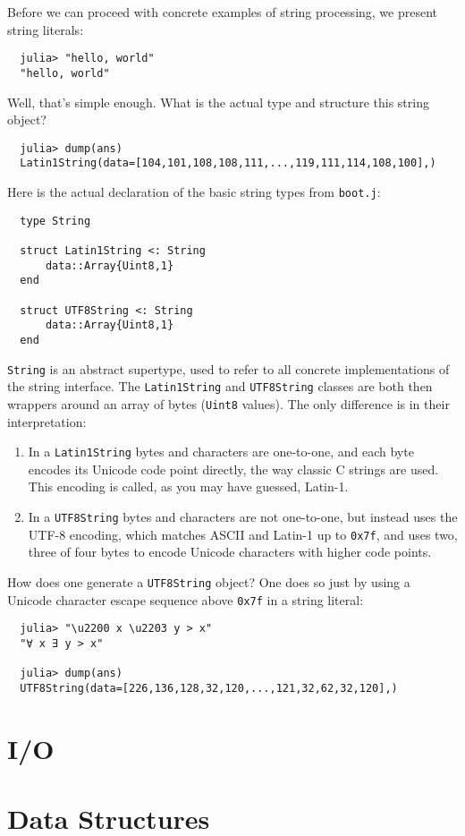 \documentclass{article}
\begin{document}
Before we can proceed with concrete examples of string processing, we present string literals:
\begin{verbatim}
  julia> "hello, world"
  "hello, world"
\end{verbatim}
Well, that's simple enough.
What is the actual type and structure this string object?
\begin{verbatim}
  julia> dump(ans)
  Latin1String(data=[104,101,108,108,111,...,119,111,114,108,100],)
\end{verbatim}
Here is the actual declaration of the basic string types from \verb|boot.j|:
\begin{verbatim}
  type String

  struct Latin1String <: String
      data::Array{Uint8,1}
  end

  struct UTF8String <: String
      data::Array{Uint8,1}
  end
\end{verbatim}
\verb|String| is an abstract supertype, used to refer to all concrete implementations of the string interface.
The \verb|Latin1String| and \verb|UTF8String| classes are both then wrappers around an array of bytes (\verb|Uint8| values).
The only difference is in their interpretation:
\begin{enumerate}
\item In a \verb|Latin1String| bytes and characters are one-to-one, and each byte encodes its Unicode code point directly, the way classic C strings are used.
This encoding is called, as you may have guessed, Latin-1.
\item In a \verb|UTF8String| bytes and characters are not one-to-one, but instead uses the UTF-8 encoding, which matches ASCII and Latin-1 up to \verb|0x7f|, and uses two, three of four bytes to encode Unicode characters with higher code points.
\end{enumerate}
How does one generate a \verb|UTF8String| object?
One does so just by using a Unicode character escape sequence above \verb|0x7f| in a string literal:
\begin{verbatim}
  julia> "\u2200 x \u2203 y > x"
  "∀ x ∃ y > x"

  julia> dump(ans)
  UTF8String(data=[226,136,128,32,120,...,121,32,62,32,120],)
\end{verbatim}

\section{I/O}
\section{Data Structures}
\end{document}
